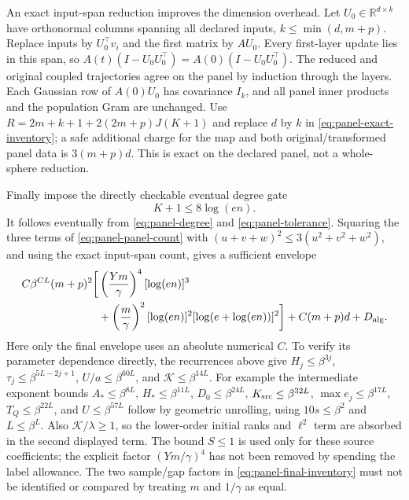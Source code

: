 An exact input-span reduction improves the dimension overhead.  Let
\(U_0\in\mathbb R^{d\times k}\) have orthonormal columns spanning
all declared inputs, \(k\le\min(d,m+p)\).  Replace inputs by
\(U_0^\top v_i\) and the first matrix by \(AU_0\).
Every first-layer update lies in this span, so
\(A(t)(I-U_0U_0^\top)=A(0)(I-U_0U_0^\top)\).
The reduced and original coupled trajectories agree on the panel by
induction through the layers.  Each Gaussian row of \(A(0)U_0\) has
covariance \(I_k\), and all panel inner products and the population
Gram are unchanged.  Use
\(R=2m+k+1+2(2m+p)J(K+1)\) and replace \(d\) by \(k\) in
\eqref{eq:panel-exact-inventory}; a safe additional charge for the
map and both original/transformed panel data is \(3(m+p)d\).
This is exact on the declared panel, not a whole-sphere reduction.

Finally impose the directly checkable eventual degree gate
\begin{equation}
 K+1\le8\log(en).
 \label{eq:panel-degree-gate}
\end{equation}
It follows eventually from \eqref{eq:panel-degree} and
\eqref{eq:panel-tolerance}.  Squaring the three terms of
\eqref{eq:panel-panel-count} with
\((u+v+w)^2\le3(u^2+v^2+w^2)\), and using the exact input-span
count, gives a sufficient envelope
\begin{equation}
 \begin{split}
 C\beta^{CL}(m+p)^2\bigg[
 &\left(\frac{Ym}{\gamma}\right)^4[\log(en)]^3\\
 &+\left(\frac m\gamma\right)^2[\log(en)]^2
                   [\log(e+\log(en))]^2\bigg]
 +C(m+p)d+D_{\rm alg}.
 \end{split}
 \label{eq:panel-final-inventory}
\end{equation}
Here only the final envelope uses an absolute numerical \(C\).
To verify its parameter dependence directly, the recurrences above
give \(H_j\le\beta^{3j}\),
\(\tau_j\le\beta^{5L-2j+1}\),
\(U/a\le\beta^{60L}\), and \(\mathcal K\le\beta^{14L}\).
For example the intermediate exponent bounds
\(A_*\le\beta^{8L}\), \(H_*\le\beta^{11L}\),
\(D_0\le\beta^{24L}\), \(K_{\rm src}\le\beta^{32L}\),
\(\max e_j\le\beta^{17L}\), \(T_Q\le\beta^{22L}\),
and \(U\le\beta^{57L}\) follow by geometric unrolling, using
\(10s\le\beta^2\) and \(L\le\beta^L\).
Also \(\mathcal K/\lambda\ge1\), so the lower-order initial ranks
and \(\ell^2\) term are absorbed in the second displayed term.
The bound \(S\le1\) is used only for these source coefficients;
the explicit factor \((Ym/\gamma)^4\) has not been removed by
spending the label allowance.  The two sample/gap factors in
\eqref{eq:panel-final-inventory} must not be identified or compared
by treating \(m\) and \(1/\gamma\) as equal.

